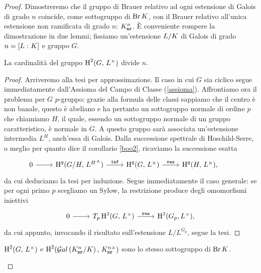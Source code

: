 \begin{proof}
Dimostreremo che il gruppo di Brauer relativo ad ogni estensione di Galois di grado $ n $ coincide, come sottogruppo di $ \operatorname{Br} K $, con il Brauer relativo all'unica estensione non ramificata di grado $ n $: $ K_\mathtt{nr}^n $. È conveniente rompere la dimostrazione in due lemmi;
fissiamo un'estensione $ L/K $ di Galois di grado $ n = [L\,\colon K] $ e gruppo $ G $.

\begin{lemma}\label{Br1}
	La cardinalità del gruppo $ \operatorname{H}^2(G,\, L^\times ) $ divide $ n $.
\end{lemma}

\begin{proof}
	Arriveremo alla tesi per approssimazione. %
	Il caso in cui $ G $ sia ciclico segue immediatamente dall'Assioma del Campo di Classe (\ref{assioma}). Affrontiamo ora il problema per $ G $ $ p $-gruppo: grazie alla formula delle classi sappiamo che il centro è non banale, questo è abeliano e ha pertanto un sottogruppo normale di ordine $ p $ che chiamiamo $ H $, il quale, essendo un sottogruppo normale di un gruppo caratteristico, è normale in $ G $. A questo gruppo sarà associata un'estensione intermedia $ L^H $, anch'essa di Galois. Dalla successione spettrale di Hoschild-Serre, o meglio per quanto dice il corollario \ref{boo2}, ricaviamo la successione esatta
	\[\begin{tikzcd}
	0 \rar & \HH^q(G/H, \, {L^H}^\times) \rar["\Inf"]
	& \HH^q(G, \, L^\times) \rar["\Res"]
	& \HH^q(H, \, L^\times),
	\end{tikzcd} \qquad  \]
	da cui deduciamo la tesi per induzione. Segue immediatamente il caso generale: se per ogni primo $ p $ scegliamo un Sylow, la restrizione produce degli omomorfismi iniettivi
	\[ \begin{tikzcd}
	0 \rar & T_p\HH^2(G, \, L^\times) \rar["\Res"] & \HH^2(G_p, L^\times),
	\end{tikzcd}  \]
	da cui appunto, invocando il risultato sull'estensione $ L/L^{G_p} $, segue la tesi.
\end{proof}

\begin{lemma}\label{br2}
	$ \operatorname{H}^2(G,\, L^\times ) $ e $ \operatorname{H}^2(\mathcal{G}al\left( K_\mathtt{nr}^n/K \right),\, K_\mathtt{nr}^{n\times}) $ sono lo stesso sottogruppo di $ \operatorname{Br} K $.
\end{lemma}


\end{proof}
